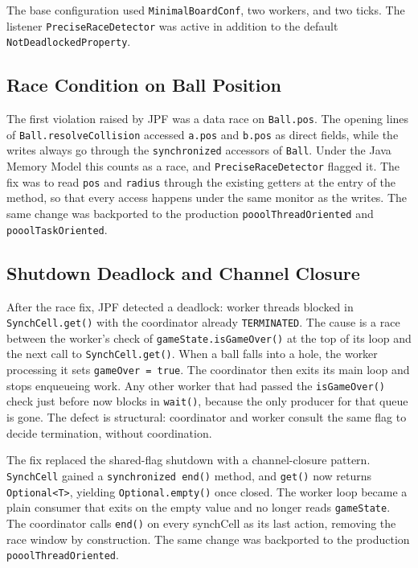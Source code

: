 \documentclass{scrartcl}
\begin{document}
The base configuration used \texttt{MinimalBoardConf}, two workers, and two ticks. The listener \texttt{PreciseRaceDetector} was active in addition to the default \texttt{NotDeadlockedProperty}.

\subsection{Race Condition on Ball Position}

The first violation raised by JPF was a data race on \texttt{Ball.pos}. The opening lines of \texttt{Ball.resolveCollision} accessed \texttt{a.pos} and \texttt{b.pos} as direct fields, while the writes always go through the \texttt{synchronized} accessors of \texttt{Ball}. Under the Java Memory Model this counts as a race, and \texttt{PreciseRaceDetector} flagged it. The fix was to read \texttt{pos} and \texttt{radius} through the existing getters at the entry of the method, so that every access happens under the same monitor as the writes. The same change was backported to the production \texttt{pooolThreadOriented} and \texttt{pooolTaskOriented}.

\subsection{Shutdown Deadlock and Channel Closure}

After the race fix, JPF detected a deadlock: worker threads blocked in \texttt{SynchCell.get()} with the coordinator already \texttt{TERMINATED}. The cause is a race between the worker's check of \texttt{gameState.isGameOver()} at the top of its loop and the next call to \texttt{SynchCell.get()}. When a ball falls into a hole, the worker processing it sets \texttt{gameOver = true}. The coordinator then exits its main loop and stops enqueueing work. Any other worker that had passed the \texttt{isGameOver()} check just before now blocks in \texttt{wait()}, because the only producer for that queue is gone. The defect is structural: coordinator and worker consult the same flag to decide termination, without coordination.

The fix replaced the shared-flag shutdown with a channel-closure pattern. \texttt{SynchCell} gained a \texttt{synchronized end()} method, and \texttt{get()} now returns \texttt{Optional<T>}, yielding \texttt{Optional.empty()} once closed. The worker loop became a plain consumer that exits on the empty value and no longer reads \texttt{gameState}. The coordinator calls \texttt{end()} on every synchCell as its last action, removing the race window by construction. The same change was backported to the production \texttt{pooolThreadOriented}.
\end{document}
